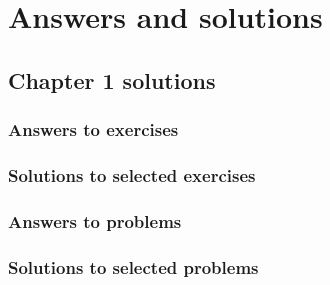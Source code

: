\chapter{Answers and solutions}
\label{appendix:ans_and_solutions}


\section*{Chapter 1 solutions}
\label{sec:chapter1sols}	
{ \footnotesize 

    \subsection*{Answers to exercises}
    

    \subsection*{Solutions to selected exercises}
    

    \subsection*{Answers to problems}
    

    \subsection*{Solutions to selected problems}
    

}